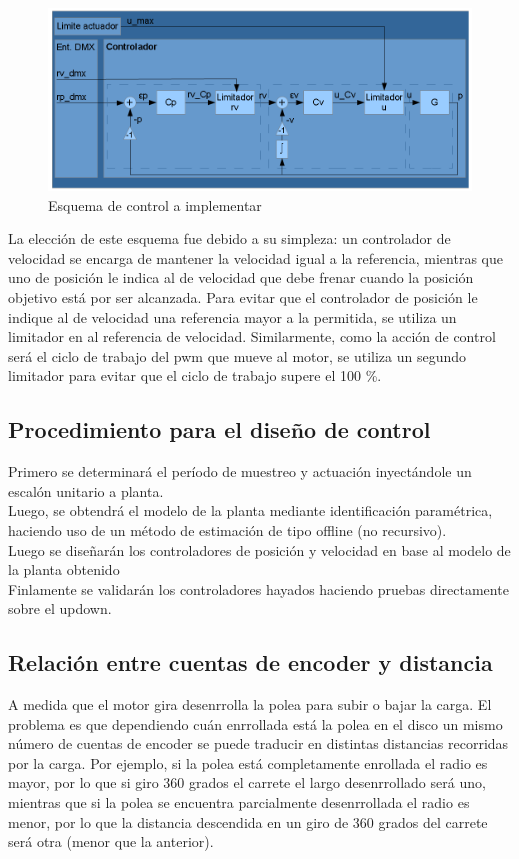 \begin{figure}[!ht]
	\centering
	\includegraphics[width=16cm,scale=1]{resources/2_1-diagramaControlador.png}
	\caption{Esquema de control a implementar}
	\label{fig:\thefigure}
\end{figure}

La elección de este esquema fue debido a su simpleza: un controlador de velocidad se encarga de mantener la velocidad igual a la referencia, mientras que uno de posición le indica al de velocidad que debe frenar cuando la posición objetivo está por ser alcanzada. Para evitar que el controlador de posición le indique al de velocidad una referencia mayor a la permitida, se utiliza un limitador en al referencia de velocidad. Similarmente, como la acción de control será el ciclo de trabajo del pwm que mueve al motor, se utiliza un segundo limitador para evitar que el ciclo de trabajo supere el 100 \%.

\subsection{Procedimiento para el diseño de control}
Primero se determinará el período de muestreo y actuación inyectándole un escalón unitario a planta.\\
Luego, se obtendrá el modelo de la planta mediante identificación paramétrica, haciendo uso de un método de estimación de tipo offline (no recursivo).\\
Luego se diseñarán los controladores de posición y velocidad en base al modelo de la planta obtenido\\
Finlamente se validarán los controladores hayados haciendo pruebas directamente sobre el updown.

\subsection{Relación entre cuentas de encoder y distancia}
A medida que el motor gira desenrrolla la polea para subir o bajar la carga. El problema es que dependiendo cuán enrrollada está la polea en el disco un mismo número de cuentas de encoder se puede traducir en distintas distancias recorridas por la carga. Por ejemplo, si la polea está completamente enrollada el radio es mayor, por lo que si giro 360 grados el carrete el largo desenrrollado será uno, mientras que si la polea se encuentra parcialmente desenrrollada el radio es menor, por lo que la distancia descendida en un giro de 360 grados del carrete será otra (menor que la anterior).\\

